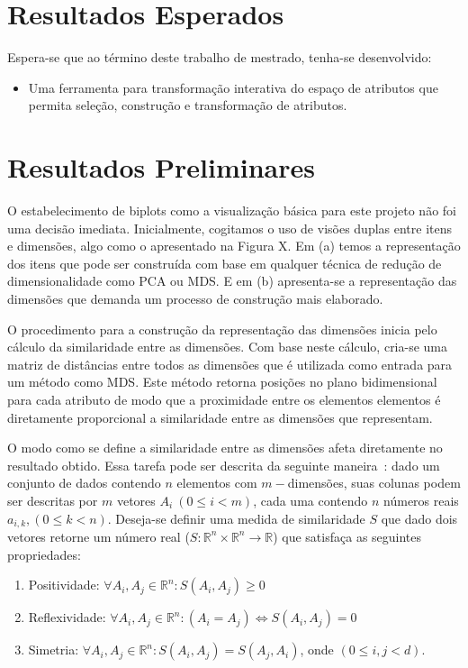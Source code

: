\section{Resultados Esperados}

Espera-se que ao término deste trabalho de mestrado,
tenha-se desenvolvido:

\begin{itemize}
    \item Uma ferramenta para
        transformação interativa do espaço de atributos que
        permita seleção, construção e transformação de
        atributos.
\end{itemize}

\section{Resultados Preliminares}

O estabelecimento de biplots como a visualização básica para
este projeto não foi uma decisão imediata. Inicialmente,
cogitamos o uso de visões duplas entre itens e dimensões,
algo como o apresentado na Figura X. Em (a) temos a
representação dos itens que pode ser construída com base em
qualquer técnica de redução de dimensionalidade como PCA ou
MDS. E em (b) apresenta-se a representação das dimensões que
demanda um processo de construção mais elaborado.

O procedimento para a construção da representação das
dimensões inicia pelo cálculo da similaridade entre as
dimensões. Com base neste cálculo, cria-se uma matriz de
distâncias entre todos as dimensões que é utilizada como
entrada para um método como MDS. Este método retorna 
posições no plano bidimensional para cada atributo de modo
que a proximidade entre os elementos elementos é diretamente
proporcional a similaridade entre as dimensões que
representam. 

O modo como se define a similaridade entre as dimensões
afeta diretamente no resultado obtido. Essa tarefa pode ser
descrita da seguinte maneira~\cite{Ankerst1998}: dado um
conjunto de dados contendo $n$ elementos com $m-$dimensões,
suas colunas podem ser descritas por $m$ vetores $A_i~(0
\leq i < m)$, cada uma contendo $n$ números reais $a_{i,k},
(0 \leq k < n)$.  Deseja-se definir uma medida de
similaridade $S$ que dado dois vetores retorne um número
real ($S : \mathbb{R}^n \times \mathbb{R}^n \rightarrow
\mathbb{R}$) que satisfaça as seguintes propriedades:

\begin{enumerate}

    \item Positividade: $\forall A_i,A_j \in \mathbb{R}^n:
        S(A_i,A_j) \geq 0 $

    \item Reflexividade: $\forall A_i,A_j \in
        \mathbb{R}^n: (A_i = A_j) \Leftrightarrow
        S(A_i,A_j) = 0 $

    \item Simetria: $\forall A_i,A_j \in
        \mathbb{R}^n: S(A_i,A_j) =
        S(A_j,A_i)$, onde $(0 \leq i,j <
        d)$.

\end{enumerate}

